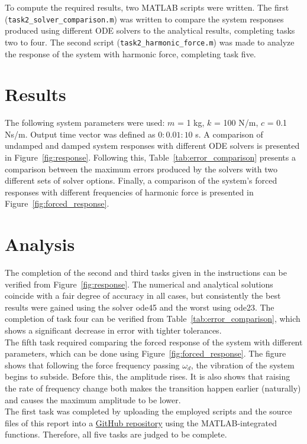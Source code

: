 \documentclass{article}
\begin{document}
	To compute the required results, two MATLAB scripts were written. The first (\texttt{task2\_solver\_comparison.m}) was written to compare the system responses produced using different ODE solvers to the analytical results, completing tasks two to four. The second script (\texttt{task2\_harmonic\_force.m}) was made to analyze the response of the system with harmonic force, completing task five.
	
	\section*{Results}
	The following system parameters were used: $m$ = 1 kg, $k$ = 100 N/m, $c$ = 0.1 Ns/m. Output time vector was defined as $0:0.01:10$ s. A comparison of undamped and damped system responses with different ODE solvers is presented in Figure~\ref*{fig:response}. Following this, Table~\ref*{tab:error_comparison} presents a comparison between the maximum errors produced by the solvers with two different sets of solver options. Finally, a comparison of the system's forced responses with different frequencies of harmonic force is presented in Figure~\ref*{fig:forced_response}.

	\section*{Analysis}
	The completion of the second and third tasks given in the instructions can be verified from Figure~\ref*{fig:response}. The numerical and analytical solutions coincide with a fair degree of accuracy in all cases, but consistently the best results were gained using the solver ode45 and the worst using ode23. The completion of task four can be verified from Table~\ref*{tab:error_comparison}, which shows a significant decrease in error with tighter tolerances.\\
	
	The fifth task required comparing the forced response of the system with different parameters, which can be done using Figure~\ref*{fig:forced_response}. The figure shows that following the force frequency passing $\omega_d$, the vibration of the system begins to subside. Before this, the amplitude rises. It is also shows that raising the rate of frequency change both makes the transition happen earlier (naturally) and causes the maximum amplitude to be lower. \\
	
	The first task was completed by uploading the employed scripts and the source files of this report into a \href{https://github.com/VesaVilleHurskainen/cmim2018}{GitHub repository} using the MATLAB-integrated functions. Therefore, all five tasks are judged to be complete.
	
\end{document}
